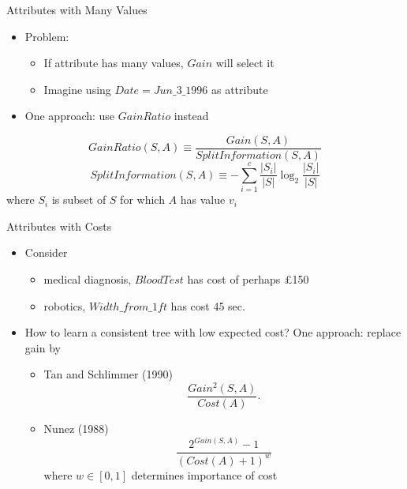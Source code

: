 \documentclass[%
pdf,
colorBG,
slideColor,
tcrico,
]{prosper}
\begin{document}
\begin{slide}{Attributes with Many Values } 
\begin{itemize}
\item  Problem: 
	\begin{itemize}
	\item If attribute has many values, $Gain$ will select it
	\item Imagine using $Date = Jun\_3\_1996$ as attribute
	\end{itemize}
\item One approach: use $GainRatio$ instead
\end{itemize}
\[GainRatio(S,A) \equiv \frac{Gain(S,A)}{SplitInformation(S,A)} \]
\[ SplitInformation(S,A) \equiv - \sum_{i=1}^{c} \frac{|S_{i}|}{|S|} \log_{2}
\frac{|S_{i}|}{|S|} \]
where $S_{i}$ is subset of $S$ for which $A$ has value $v_{i}$
\end{slide}


\begin{slide}{Attributes with Costs } 
\tiny
\begin{itemize}
 \item Consider 
	\begin{itemize}
	\item medical diagnosis,  $BloodTest$ has cost of perhaps \pounds 150
	\item robotics, $Width\_from\_1ft$ has cost 45 sec.
	\end{itemize}
\item How to learn a consistent tree with low expected cost? One approach: replace gain by
	\begin{itemize}
	\item Tan and Schlimmer (1990)
	\[ \frac{Gain^{2}(S,A)}{Cost(A)}. \]
	\item Nunez (1988)
	\[  \frac{2^{Gain(S,A)} - 1}{(Cost(A) + 1)^{w}} \]
	where $w \in [0,1]$ determines importance of cost
	\end{itemize}
\end{itemize}
\end{slide}
\end{document}
